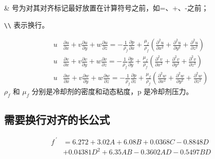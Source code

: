 \& 号为对其对齐标记最好放置在计算符号之前，如=、+、-之前；

\verb|\\| 表示换行。

\begin{align}%
    u & \frac{\partial u}{\partial x}+v \frac{\partial u}{\partial y}+w \frac{\partial u}{\partial z}=-\frac{1}{\rho_{f}} \frac{\partial p}{\partial x}+\frac{\mu_{f}}{\rho_{f}}\left(\frac{\partial^{2} u}{\partial x^{2}}+\frac{\partial^{2} u}{\partial y^{2}}+\frac{\partial^{2} u}{\partial z^{2}}\right) \\
    u & \frac{\partial v}{\partial x}+v \frac{\partial v}{\partial y}+w \frac{\partial v}{\partial z}=-\frac{1}{\rho_{f}} \frac{\partial p}{\partial y}+\frac{\mu_{f}}{\rho_{f}}\left(\frac{\partial^{2} v}{\partial x^{2}}+\frac{\partial^{2} v}{\partial y^{3}}+\frac{\partial^{2} v}{\partial z^{3}}\right) \\
    u & \frac{\partial w}{\partial x}+v \frac{\partial w}{\partial y}+w \frac{\partial w}{\partial z}=-\frac{1}{\rho_{f}} \frac{\partial p}{\partial z}+\frac{\mu_{f}}{\rho_{f}}\left(\frac{\partial^{2} w}{\partial x^{2}}+\frac{\partial^{2} w}{\partial y^{2}}+\frac{\partial^{2} w}{\partial z^{2}}\right)
\end{align}
$\rho_{f}$ 和 $\mu_{f}$ 分别是冷却剂的密度和动态粘度，p 是冷却剂压力。


\subsection{需要换行对齐的长公式}

\begin{equation}\label{eq:P}
    \begin{split}
        f^{\ \prime} & = 6.272 + 3.02 A + 6.08 B + 0.0368 C - 0.8848 D  \\
            & + 0.04381 D^2 + 6.35 AB - 0.3602 AD - 0.5497 BD
    \end{split}
\end{equation}

